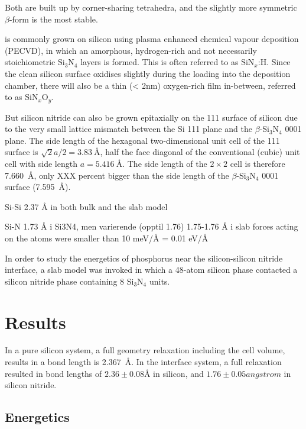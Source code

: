 \documentclass[11pt,bibliography=totoc,index=totoc]{scrbook}   %
\begin{document}
Both are built up by corner-sharing tetrahedra, and the slightly more symmetric $\beta$-form is the most stable.

is commonly grown on silicon using plasma enhanced chemical vapour deposition (PECVD), 
in which an amorphous, hydrogen-rich and not necessarily stoichiometric Si$_3$N$_4$ layers is formed. 
This is often referred to as SiN$_x$:H. Since the clean silicon surface oxidises slightly during the loading into the 
deposition chamber, there will also be a thin (< 2nm) oxygen-rich film in-between, referred to as SiN$_x$O$_y$.
\cite{Aberle:2001}

But silicon nitride can also be grown epitaxially on the 111 surface of silicon due to the very small lattice mismatch
between the Si 111 plane and the $\beta$-Si$_3$N$_4$ 0001 plane.
The side length of the hexagonal two-dimensional unit cell of the 111 surface is $\sqrt{2}a/2=\SI{3.83}{\angstrom}$, half the face diagonal of the conventional (cubic) unit cell with side length $a=\SI{5.416}{\angstrom}$. The side length of the $2\times 2$ cell is therefore \SI{7.660}{\angstrom}, only XXX percent bigger than the side length of the $\beta$-Si$_3$N$_4$ 0001 surface (\SI{7.595}{\angstrom}).




Si-Si 2.37 Å in both bulk and the slab model

Si-N 1.73 Å i Si3N4, men varierende (opptil 1.76)
1.75-1.76 Å i slab
forces acting on the atoms were smaller than 10 meV/Å = 0.01 eV/Å


In order to study the energetics of phosphorus near the silicon-silicon nitride interface,
a slab model was invoked in which a 48-atom silicon phase contacted a silicon nitride phase containing 
8 Si$_3$N$_4$ units.


\section{Results}

In a pure silicon system, a full geometry relaxation including the cell volume, results in a bond length is \SI{2.367}{\angstrom}. %
In the interface system, a full relaxation resulted in bond lengths of $2.36\pm0.08\si{\angstrom}$ in silicon, and $1.76\pm 0.05\si{angstrom}$ in silicon nitride.


\subsection{Energetics}
\end{document}
